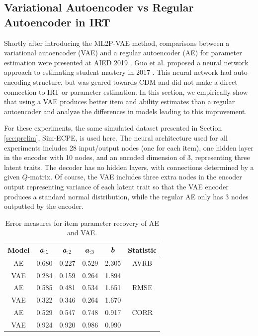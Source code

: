 \subsection{Variational Autoencoder vs Regular Autoencoder in IRT}\label{sec:ae_v_vae_results}
Shortly after introducing the ML2P-VAE method, comparisons between a variational autoencoder (VAE) and a regular autoencoder (AE) for parameter estimation were presented at AIED 2019 \cite{aied_paper}. Guo et al. proposed a neural network approach to estimating student mastery in 2017 \cite{guo2017}. This neural network had auto-encoding structure, but was geared towards CDM and did not make a direct connection to IRT or parameter estimation. In this section, we empirically show that using a VAE produces better item and ability estimates than a regular autoencoder and analyze the differences in models leading to this improvement.

For these experiments, the same simulated dataset presented in Section \ref{sec:prelim}, Sim-ECPE, is used here. The neural architecture used for all experiments includes 28 input/output nodes (one for each item), one hidden layer in the encoder with 10 nodes, and an encoded dimension of 3, representing three latent traits. The decoder has no hidden layers, with connections determined by a given $Q$-matrix. Of course, the VAE includes three extra nodes in the encoder output representing variance of each latent trait so that the VAE encoder produces a standard normal distribution, while the regular AE only has 3 nodes outputted by the encoder.

\begin{table}[h]
\centering
\begin{tabular}{cccccc}
\hline
Model   & $\boldsymbol{a}_{:1}$ & $\boldsymbol{a}_{:2}$ & $\boldsymbol{a}_{:3}$ & $\boldsymbol{b}$ & Statistic \\
      \hline
AE & 0.680 & 0.227 & 0.529 & 2.305 & AVRB \\
VAE   &0.284  & 0.159 & 0.264 & 1.894 &  \\
\hline
AE & 0.585 & 0.481 & 0.534 & 1.651 & RMSE \\
VAE   & 0.322 & 0.346 & 0.264 & 1.670 & \\
\hline
AE & 0.529 & 0.547 & 0.748 & 0.917 & CORR \\
VAE   & 0.924 & 0.920 & 0.986 & 0.990 & \\
\hline
\end{tabular}
\caption{Error measures for item parameter recovery of AE and VAE.}
\label{tab:vae_vs_ae_items}
\end{table}

